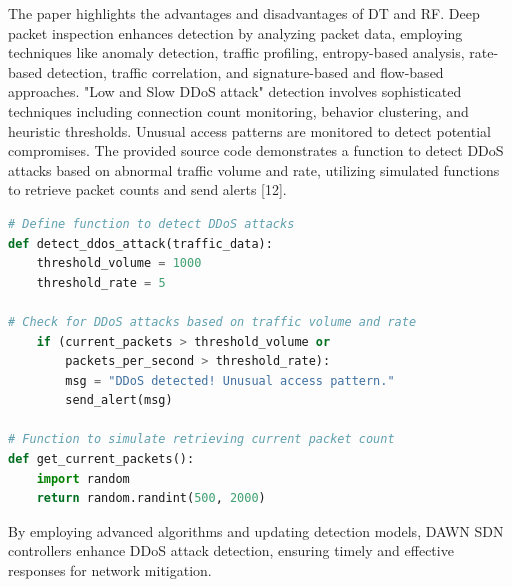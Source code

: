 \documentclass[conference]{IEEEtran}
\begin{document}
The paper highlights the advantages and disadvantages of DT and RF. Deep packet inspection enhances detection by analyzing packet data, employing techniques like anomaly detection, traffic profiling, entropy-based analysis, rate-based detection, traffic correlation, and signature-based and flow-based approaches. "Low and Slow DDoS attack" detection involves sophisticated techniques including connection count monitoring, behavior clustering, and heuristic thresholds. Unusual access patterns are monitored to detect potential compromises. The provided source code demonstrates a function to detect DDoS attacks based on abnormal traffic volume and rate, utilizing simulated functions to retrieve packet counts and send alerts [12].

\lstset{basicstyle=\small, basewidth=0.5em}

\begin{minipage}{0.75\linewidth}
\begin{lstlisting}[language=Python, caption=DDoS Detection Function]
# Define function to detect DDoS attacks
def detect_ddos_attack(traffic_data):
    threshold_volume = 1000
    threshold_rate = 5
    
# Check for DDoS attacks based on traffic volume and rate
    if (current_packets > threshold_volume or 
        packets_per_second > threshold_rate):
        msg = "DDoS detected! Unusual access pattern."
        send_alert(msg)

# Function to simulate retrieving current packet count
def get_current_packets():
    import random
    return random.randint(500, 2000)
\end{lstlisting}
\end{minipage}

By employing advanced algorithms and updating detection models, DAWN SDN controllers enhance DDoS attack detection, ensuring timely and effective responses for network mitigation.
\end{document}
